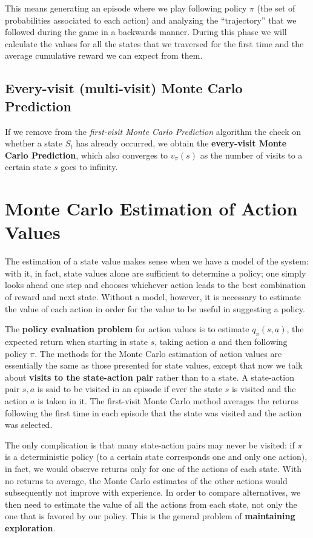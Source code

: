 This means generating an episode where we play following policy $\pi$ (the set of probabilities associated to each action) and analyzing the ``trajectory'' that we followed during the game in a backwards manner. During this phase we will calculate the values for all the states that we traversed for the first time and the average cumulative reward we can expect from them.

\subsection{Every-visit (multi-visit) Monte Carlo Prediction}
If we remove from the \textit{first-visit Monte Carlo Prediction} algorithm the check on whether a state $S_t$ has already occurred, we obtain the \textbf{every-visit Monte Carlo Prediction}, which also converges to $v_\pi (s)$ as the number of visits to a certain state $s$ goes to infinity.

\section{Monte Carlo Estimation of Action Values}
The estimation of a state value makes sense when we have a model of the system: with it, in fact, state values alone are sufficient to determine a policy; one simply looks ahead one step and chooses whichever action leads to the best combination of reward and next state. Without a model, however, it is necessary to estimate the value of each action in order for the value to be useful in suggesting a policy. 

The \textbf{policy evaluation problem} for action values is to estimate $q_\pi (s,a)$, the expected return when starting in state $s$, taking action $a$ and then following policy $\pi$. The methods for the Monte Carlo estimation of action values are essentially the same as those presented for state values, except that now we talk about \textbf{visits to the state-action pair} rather than to a state. A state-action pair $s,a$ is said to be visited in an episode if ever the state $s$ is visited and the action $a$ is taken in it. The first-visit Monte Carlo method averages the returns following the first time in each episode that the state was visited and the action was selected.

The only complication is that many state-action pairs may never be visited: if $\pi$ is a deterministic policy (to a certain state corresponds one and only one action), in fact, we would observe returns only for one of the actions of each state. With no returns to average, the Monte Carlo estimates of the other actions would subsequently not improve with experience. In order to compare alternatives, we then need to estimate the value of all the actions from each state, not only the one that is favored by our policy. This is the general problem of \textbf{maintaining exploration}.


